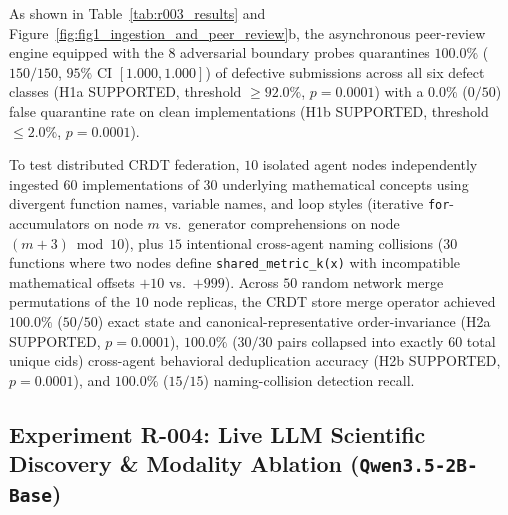 \documentclass[10pt,twocolumn]{article}
\begin{document}
As shown in Table~\ref{tab:r003_results} and Figure~\ref{fig:fig1_ingestion_and_peer_review}b, the asynchronous peer-review engine equipped with the 8 adversarial boundary probes quarantines $100.0\%$ ($150/150$, $95\%$ CI $[1.000, 1.000]$) of defective submissions across all six defect classes (H1a SUPPORTED, threshold $\ge 92.0\%$, $p = 0.0001$) with a $0.0\%$ ($0/50$) false quarantine rate on clean implementations (H1b SUPPORTED, threshold $\le 2.0\%$, $p = 0.0001$).

To test distributed CRDT federation, $10$ isolated agent nodes independently ingested $60$ implementations of $30$ underlying mathematical concepts using divergent function names, variable names, and loop styles (iterative \texttt{for}-accumulators on node $m$ vs.\ generator comprehensions on node $(m+3) \bmod 10$), plus $15$ intentional cross-agent naming collisions ($30$ functions where two nodes define \texttt{shared\_metric\_k(x)} with incompatible mathematical offsets $+10$ vs.\ $+999$). Across $50$ random network merge permutations of the $10$ node replicas, the CRDT store merge operator achieved $100.0\%$ ($50/50$) exact state and canonical-representative order-invariance (H2a SUPPORTED, $p = 0.0001$), $100.0\%$ ($30/30$ pairs collapsed into exactly $60$ total unique $\text{cid}$s) cross-agent behavioral deduplication accuracy (H2b SUPPORTED, $p = 0.0001$), and $100.0\%$ ($15/15$) naming-collision detection recall.

\subsection{Experiment R-004: Live LLM Scientific Discovery \& Modality Ablation (\texttt{Qwen3.5-2B-Base})}
\label{sec:exp_r004}

\begin{table}[t]
\centering
\caption{\textbf{Pre-registered hypothesis outcomes for Experiment R-004: Live LLM Scientific \& Algorithmic Discovery Across Concept-Serving Modalities (\texttt{Qwen3.5-2B-Base}).} Auto-generated by \texttt{ResearchHarness} (Artifact SHA-256: \texttt{3cb5a83eab3f}).}
\label{tab:r004_results}
\footnotesize

\end{table}
\end{document}
